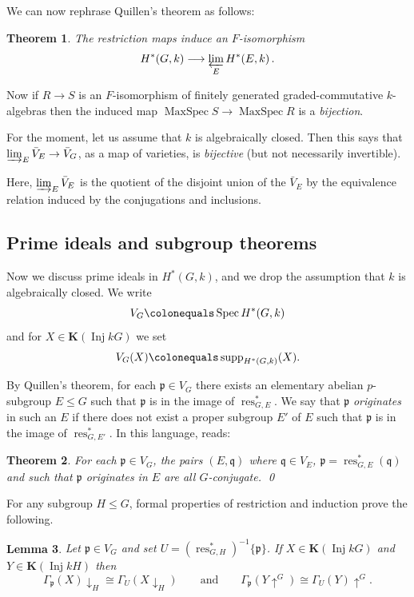 \documentclass{amsart}[a4]
\newtheorem{theorem}{Theorem}[section]
\newtheorem{lemma}[theorem]{Lemma}
\theoremstyle{definition}
\theoremstyle{remark}
\numberwithin{equation}{section}
\newcommand{\Inj}{\operatorname{Inj}}
\newcommand{\MaxSpec}{\operatorname{MaxSpec}}
\newcommand{\res}{\operatorname{res}}
\newcommand{\Spec}{\operatorname{Spec}}
\newcommand{\supp}{\operatorname{supp}}
\newcommand{\da}{{\downarrow}}
\newcommand{\lto}{\longrightarrow}
\newcommand{\ua}{{\uparrow}}
\newcommand{\bfK}{\mathbf K}
\newcommand{\fp}{\mathfrak{p}}
\newcommand{\fq}{\mathfrak{q}}
\let\Gamma\varGamma
\begin{document}
We can now rephrase Quillen's theorem as follows:

\begin{theorem}
\pushQED{\qed}
The restriction maps induce an $F$-isomorphism
\[ 
H^*(G,k)\lto\varprojlim_{E} H^*(E,k)\,.\qedhere
\]
\end{theorem}

Now if $R\to S$ is an $F$-isomorphism of finitely generated 
graded-commutative $k$-algebras then the induced map $\MaxSpec S \to \MaxSpec R$
is a \emph{bijection}.

For the moment, let us assume that $k$ is algebraically
closed. Then this says that
$\varinjlim_{E}\bar V_E\to \bar V_G$, as a map of varieties, is \emph{bijective}
(but not necessarily invertible).

Here, $\varinjlim_{E}\bar V_E$ is the quotient of the disjoint union
of the $\bar V_E$ by the equivalence relation induced
by the conjugations and inclusions.

\subsection*{Prime ideals and subgroup theorems}

Now we discuss prime ideals in $H^*(G,k)$, and we drop the assumption
that $k$ is algebraically closed.  We write
\[V_G\colonequals\Spec H^*(G,k)\]
and for $X\in\bfK(\Inj kG)$ we set
\[V_G(X)\colonequals\supp_{H^*(G,k)}(X).\]

By Quillen's theorem, for each
$\fp \in V_G$ there exists an elementary abelian $p$-subgroup
$E\le G$ such that $\fp$ is in the image of $\res_{G,E}^*$.  We say
that $\fp$ \emph{originates} in such an $E$ if there
does not exist a proper subgroup $E'$ of $E$ such that $\fp$ is in the
image of $\res_{G,E'}^*$. In this language, \cite[Theorem~10.2]{Quillen:1971c} reads:

\begin{theorem}
\label{th:origin}
For each $\fp \in V_G$, the pairs $(E,\fq)$ where $\fq\in V_E$,  $\fp=\res_{G,E}^*(\fq)$ and
such that $\fp$ originates in $E$ are all $G$-conjugate. \qed
\end{theorem}

For any subgroup $H\le G$, formal properties of restriction and induction
prove the following.

\begin{lemma}\label{le:supp-res-ind}
Let $\fp \in V_G$ and set $U=(\res_{G,H}^*)^{-1}\{\fp \}$. If $X\in
\bfK(\Inj kG)$ and $Y\in \bfK(\Inj kH)$ then
\[\Gamma_\fp(X)\da_H\cong \Gamma_U(X\da_H)
  \qquad\text{and}\qquad\Gamma_\fp (Y\ua^G)\cong \Gamma_U (Y)\ua^G.\]
\end{lemma}
\end{document}
